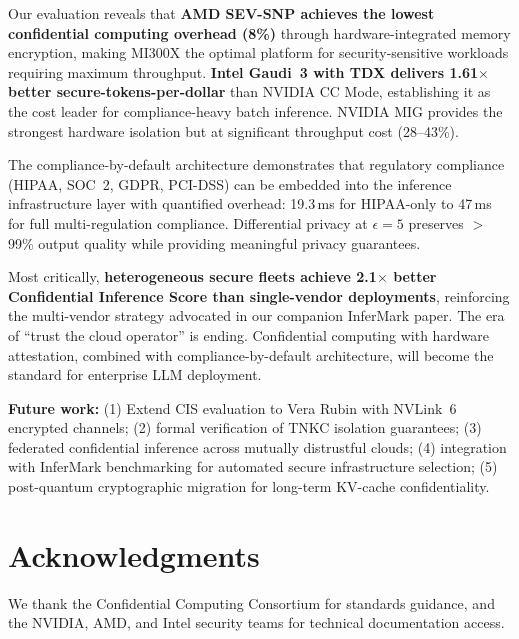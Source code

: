 \documentclass[conference,10pt]{IEEEtran}
\begin{document}
Our evaluation reveals that \textbf{AMD SEV-SNP achieves the lowest confidential computing overhead (8\%)} through hardware-integrated memory encryption, making MI300X the optimal platform for security-sensitive workloads requiring maximum throughput. \textbf{Intel Gaudi~3 with TDX delivers 1.61$\times$ better secure-tokens-per-dollar} than NVIDIA CC Mode, establishing it as the cost leader for compliance-heavy batch inference. NVIDIA MIG provides the strongest hardware isolation but at significant throughput cost (28--43\%).

The compliance-by-default architecture demonstrates that regulatory compliance (HIPAA, SOC~2, GDPR, PCI-DSS) can be embedded into the inference infrastructure layer with quantified overhead: 19.3\,ms for HIPAA-only to 47\,ms for full multi-regulation compliance. Differential privacy at $\epsilon=5$ preserves $>$99\% output quality while providing meaningful privacy guarantees.

Most critically, \textbf{heterogeneous secure fleets achieve 2.1$\times$ better Confidential Inference Score than single-vendor deployments}, reinforcing the multi-vendor strategy advocated in our companion InferMark paper. The era of ``trust the cloud operator'' is ending. Confidential computing with hardware attestation, combined with compliance-by-default architecture, will become the standard for enterprise LLM deployment.

\textbf{Future work:} (1) Extend CIS evaluation to Vera Rubin with NVLink~6 encrypted channels; (2) formal verification of TNKC isolation guarantees; (3) federated confidential inference across mutually distrustful clouds; (4) integration with InferMark benchmarking for automated secure infrastructure selection; (5) post-quantum cryptographic migration for long-term KV-cache confidentiality.

\section*{Acknowledgments}
We thank the Confidential Computing Consortium for standards guidance, and the NVIDIA, AMD, and Intel security teams for technical documentation access.

\balance


\end{document}
